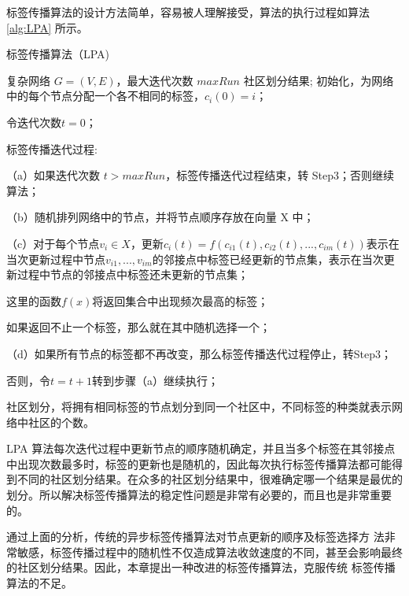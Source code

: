 标签传播算法的设计方法简单，容易被人理解接受，算法的执行过程如算法\ref{alg:LPA}
所示。
\begin{algorithm}[htb]  
  \caption{标签传播算法（LPA)}  
  \label{alg:LPA}  
  \begin{algorithmic}[1]  
    \Require  
      复杂网络 $G = (V, E)$，最大迭代次数 $maxRun$  
    \Ensure  
      社区划分结果;  
    \State  初始化，为网络中的每个节点分配一个各不相同的标签，$c_i(0)=i$；

            令迭代次数$t=0$；

    \State  标签传播迭代过程:

            （a）如果迭代次数 $t > maxRun$，标签传播迭代过程结束，转 Step3；否则继续算法；

            （b）随机排列网络中的节点，并将节点顺序存放在向量 X 中；

            （c）对于每个节点$v_i\in X$，更新$c_i(t)=f(c_{i1}(t), c_{i2}(t),..., c_{im}(t))$表示在当次更新过程中节点$v_{i1}, ..., v_{im}$的邻接点中标签已经更新的节点集，表示在当次更新过程中节点的邻接点中标签还未更新的节点集；

            这里的函数$f(x)$将返回集合中出现频次最高的标签；

            如果返回不止一个标签，那么就在其中随机选择一个；

            （d）如果所有节点的标签都不再改变，那么标签传播迭代过程停止，转Step3；

            否则，令$t = t+1$转到步骤（a）继续执行；

    \State 社区划分，将拥有相同标签的节点划分到同一个社区中，不同标签的种类就表示网络中社区的个数。
  \end{algorithmic}  
\end{algorithm} 

LPA 算法每次迭代过程中更新节点的顺序随机确定，并且当多个标签在其邻接点中出现次数最多时，标签的更新也是随机的，因此每次执行标签传播算法都可能得到不同的社区划分结果。在众多的社区划分结果中，很难确定哪一个结果是最优的划分。所以解决标签传播算法的稳定性问题是非常有必要的，而且也是非常重要的。

通过上面的分析，传统的异步标签传播算法对节点更新的顺序及标签选择方
法非常敏感，标签传播过程中的随机性不仅造成算法收敛速度的不同，甚至会影响最终的社区划分结果。因此，本章提出一种改进的标签传播算法，克服传统
标签传播算法的不足。


